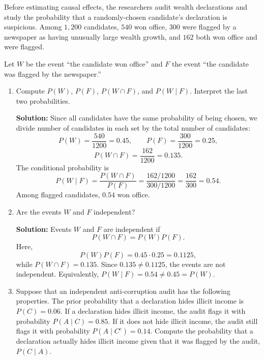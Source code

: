 \documentclass[11pt]{exam}
\begin{document}
\begin{questions}

\question[3]
Before estimating causal effects, the researchers audit wealth declarations and study the probability that a randomly-chosen candidate's declaration is suspicious. Among $1,200$ candidates, $540$ won office, $300$ were flagged by a newspaper as having unusually large wealth growth, and $162$ both won office and were flagged.

Let $W$ be the event ``the candidate won office'' and $F$ the event ``the candidate was flagged by the newspaper.''

\begin{enumerate}[leftmargin = 0.5cm, label = (\alph*), rightmargin = 0.2cm]
    \item Compute $P(W)$, $P(F)$, $P(W\cap F)$, and $P(W\mid F)$. Interpret the last two probabilities.

    \begin{solutionorbox}[5.2cm]
    \textbf{Solution:} Since all candidates have the same probability of being chosen, we divide number of candidates in each set by the total number of candidates:
    \[
    P(W)=\frac{540}{1200}=0.45, \qquad
    P(F)=\frac{300}{1200}=0.25,
    \]
    \[
    P(W\cap F)=\frac{162}{1200}=0.135.
    \]
    The conditional probability is
    \[
    P(W\mid F)=\frac{P(W\cap F)}{P(F)}=\frac{162/1200}{300/1200}=\frac{162}{300}=0.54.
    \]
    Among flagged candidates, $0.54$ won office.
    \end{solutionorbox}

    \item Are the events $W$ and $F$ independent?

    \begin{solutionorbox}[4.4cm]
    \textbf{Solution:} Events $W$ and $F$ are independent if
    \[
    P(W\cap F)=P(W)P(F).
    \]
    Here,
    \[
    P(W)P(F)=0.45\cdot 0.25=0.1125,
    \]
    while $P(W\cap F)=0.135$. Since $0.135\neq 0.1125$, the events are not independent. Equivalently, $P(W\mid F)=0.54\neq 0.45=P(W)$.
    \end{solutionorbox}

    \item Suppose that an independent anti-corruption audit has the following properties. The prior probability that a declaration hides illicit income is $P(C)=0.06$. If a declaration hides illicit income, the audit flags it with probability $P(A\mid C)=0.85$. If it does not hide illicit income, the audit still flags it with probability $P(A\mid C^c)=0.14$. Compute the probability that a declaration actually hides illicit income given that it was flagged by the audit, $P(C\mid A)$.


\end{enumerate}
\end{questions}
\end{document}
